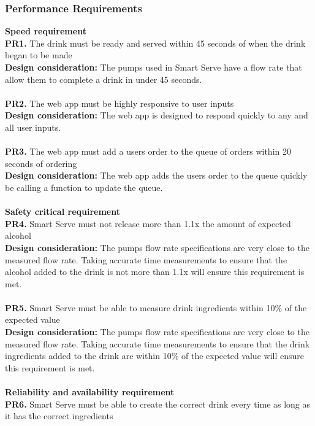 \documentclass[12pt, titlepage]{article}
\begin{document}
\subsubsection{Performance Requirements}
    \textbf{Speed requirement}\\
        \noindent\textbf{PR1.} The drink must be ready and served within 45 seconds of when the drink began to be made \\
        \indent\textbf{Design consideration:} The pumps used in Smart Serve have a flow rate that allow them to complete a drink in under 45 seconds.\\\\
        \textbf{PR2.} The web app must be highly responsive to user inputs \\
        \indent\textbf{Design consideration:} The web app is designed to respond quickly to any and all user inputs.\\\\
        \textbf{PR3.} The web app must add a users order to the queue of orders within 20 seconds of ordering \\
        \indent\textbf{Design consideration:} The web app adds the users order to the queue quickly be calling a function to update the queue.\\\\
    \textbf{Safety critical requirement}\\
        \noindent\textbf{PR4.} Smart Serve must not release more than 1.1x the amount of expected alcohol \\
        \indent\textbf{Design consideration:} The pumps flow rate specifications are very close to the measured flow rate. Taking accurate time measurements to ensure that the alcohol added to the drink is not more than 1.1x will ensure this requirement is met.\\\\
        \noindent\textbf{PR5.} Smart Serve must be able to measure drink ingredients within 10\% of the expected value \\
        \indent\textbf{Design consideration:} The pumps flow rate specifications are very close to the measured flow rate. Taking accurate time measurements to ensure that the drink ingredients added to the drink are within 10\% of the expected value will ensure this requirement is met.\\\\
    \textbf{Reliability and availability requirement}\\
        \noindent\textbf{PR6.} Smart Serve must be able to create the correct drink every time as long as it has the correct ingredients \\
\end{document}
